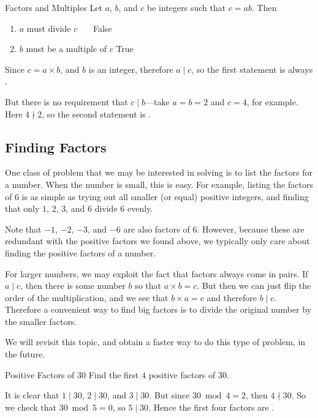 \documentclass[a4paper,10pt]{report}
\begin{document}
\begin{problem}{Factors and Multiples}
 Let \(a\), \(b\), and \(c\) be integers such that \(c = ab\). Then
 \begin{enumerate}
  \item \(a\) must divide \(c\) \hfill {}~~~False
  \item \(b\) must be a multiple of \(c\) \hfill True~~~
 \end{enumerate}

 \begin{solution}
  Since \(c = a \times b\), and \(b\) is an integer, therefore \(a \mid c\), so
  the first statement is always .

  But there is no requirement that \(c \mid b\)---take \(a = b = 2\) and \(c =
  4\), for example. Here \(4 \nmid 2\), so the second statement is
  .
 \end{solution}
\end{problem}

\subsection{Finding Factors}

One class of problem that we may be interested in solving is to list the
factors for a number. When the number is small, this is easy. For example,
listing the factors of \(6\) is as simple as trying out all smaller (or equal)
positive integers, and finding that only \(1\), \(2\), \(3\), and \(6\) divide
\(6\) evenly.

Note that \(-1\), \(-2\), \(-3\), and \(-6\) are also factors of \(6\).
However, because these are redundant with the positive factors we found above,
we typically only care about finding the positive factors of a number.

For larger numbers, we may exploit the fact that factors always come in pairs.
If \(a \mid c\), then there is some number \(b\) so that \(a \times b = c\).
But then we can just flip the order of the multiplication, and we see that \(b
\times a = c\) and therefore \(b \mid c\). Therefore a convenient way to find
big factors is to divide the original number by the smaller factors.

We will revisit this topic, and obtain a faster way to do this type of problem,
in the future.

\begin{problem}{Positive Factors of \(30\)}
 Find the first \(4\) positive factors of \(30\).

 \begin{solution}
  It is clear that \(1 \mid 30\), \(2 \mid 30\), and \(3 \mid 30\). But since
  \(30 \bmod 4 = 2\), then \(4 \nmid 30\). So we check that \(30 \bmod 5 = 0\),
  so \(5 \mid 30\). Hence the first four factors are .
 \end{solution}
\end{problem}
\end{document}
